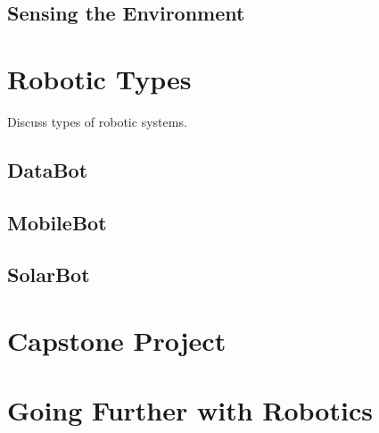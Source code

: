 \documentclass[
]{book}
\begin{document}
\hypertarget{sensing-the-environment}{%
\section{Sensing the Environment}\label{sensing-the-environment}}

\hypertarget{robotic-types}{%
\chapter{Robotic Types}\label{robotic-types}}

Discuss types of robotic systems.

\hypertarget{databot}{%
\section{DataBot}\label{databot}}

\hypertarget{mobilebot}{%
\section{MobileBot}\label{mobilebot}}

\hypertarget{solarbot}{%
\section{SolarBot}\label{solarbot}}

\hypertarget{capstone-project}{%
\chapter{Capstone Project}\label{capstone-project}}

\hypertarget{going-further-with-robotics}{%
\chapter{Going Further with Robotics}\label{going-further-with-robotics}}

  
\end{document}
